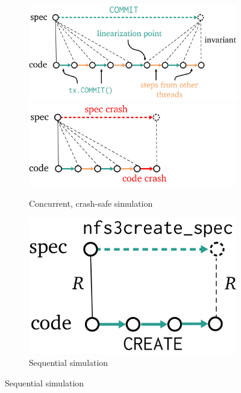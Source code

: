 \begin{figure}
  \begin{subfigure}[m]{0.6\textwidth}
    \vspace{0pt}
  \includegraphics{fig/concurrent-refinement.png}
  \includegraphics{fig/crash-refinement.png}
  \caption{Concurrent, crash-safe simulation}
  \label{fig:refinement:concurrent}
  \end{subfigure}%
\hfill%
  \begin{subfigure}[m]{0.4\textwidth}
    \vspace{0pt}
  \includegraphics{fig/sequential-refinement.png}
  \caption{Sequential simulation}

\end{subfigure}
\end{figure}
